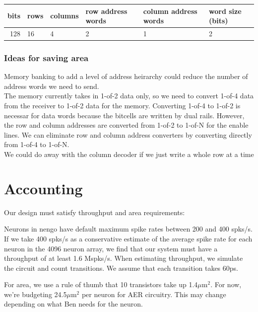 \documentclass{article}
\begin{document}
\begin{center}
    \begin{tabular}{|r|l|l|l|l|l|}
    \hline
    bits & rows & columns & row address words & column address words & word size (bits) \\ \hline
    128 & 16 & 4 & 2 & 1 & 2 \\ \hline
    \end{tabular}
\end{center}

\subsubsection*{Ideas for saving area}

\noindent
Memory banking to add a level of address heirarchy could reduce
the number of address words we need to send. \\

\noindent
The memory currently takes in 1-of-2 data only, so we need to convert
1-of-4 data from the receiver to 1-of-2 data for the memory. 
Converting 1-of-4 to 1-of-2 is necessar for data words because the bitcells 
are written by dual rails.
However, the row and column addresses are converted from 1-of-2 to 1-of-N 
for the enable lines. 
We can eliminate row and column address converters by converting directly 
from 1-of-4 to 1-of-N. \\

\noindent
We could do away with the column decoder if we just write a whole row at a time

\section{Accounting \label{sec:accounting}}

Our design must satisfy throughput and area requirements:

Neurons in nengo have default maximum spike rates between 200 and 400 spks/s.
If we take 400 spks/s as a conservative estimate of the average spike rate for 
each neuron in the 4096 neuron array, we find that our system must have a
throughput of at least 1.6 Mspks/s.
When estimating throughput, we simulate the circuit and count transitions.
We assume that each transition takes 60ps.

For area, we use a rule of thumb that 10 transistors take up 1.4$\mu$m$^2$.
For now, we're budgeting 24.5$\mu$m$^2$ per neuron for AER circuitry. This
may change depending on what Ben needs for the neuron.
\end{document}
